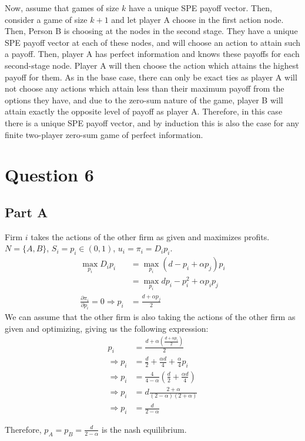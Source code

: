 \documentclass[11pt]{article} %
\begin{document}
Now, assume that games of size $k$ have a unique SPE payoff vector. Then, consider a game of size $k+1$ and let player A choose in the first action node. Then,   Person B is choosing at the nodes in the second stage. They have a unique SPE payoff vector at each of these nodes, and will choose an action to attain such a payoff. Then, player A has perfect information and knows these payoffs for each second-stage node. Player A will then choose the action which attains the highest payoff for them. As in the base case, there can only be exact ties as player A will not choose any actions which attain less than their maximum payoff from the options they have, and due to the zero-sum nature of the game, player B will attain exactly the opposite level of payoff as player A. Therefore, in this case there is a unique SPE payoff vector, and by induction this is also the case for any finite two-player zero-sum game of perfect information.
\section{Question 6}
\subsection{Part A}
Firm $i$ takes the actions of the other firm as given and maximizes profits. $N = \{A,B\}$, $S_i = p_i \in (0,1)$, $u_i = \pi_i = D_ip_i$.
\begin{align*}
\max_{p_i} D_ip_i &= \max_{p_i} (d - p_i + \alpha p_j)p_i\\
&= \max_{p_i} dp_i - p_i^2 + \alpha p_ip_j\\
\frac{\partial \pi_i}{\partial p_i} = 0 \Rightarrow p_i &= \frac{d + \alpha p_j}{2}
\end{align*}
We can assume that the other firm is also taking the actions of the other firm as given and optimizing, giving us the following expression:
\begin{align*}
p_i &= \frac{d + \alpha \left(\frac{d + \alpha p_i}{2} \right)}{2}\\
\Rightarrow p_i &= \frac{d}{2} + \frac{\alpha d}{4} + \frac{\alpha}{4}p_i\\
\Rightarrow p_i &= \frac{4}{4-\alpha}\left(\frac{d}{2} + \frac{\alpha d}{4}\right)\\
\Rightarrow p_i &= d\frac{2+\alpha}{(2-\alpha)(2+\alpha)}\\
\Rightarrow p_i &= \frac{d}{2-\alpha}
\end{align*}

Therefore, $p_A = p_B = \frac{d}{2-\alpha}$ is the nash equilibrium.
\end{document}
